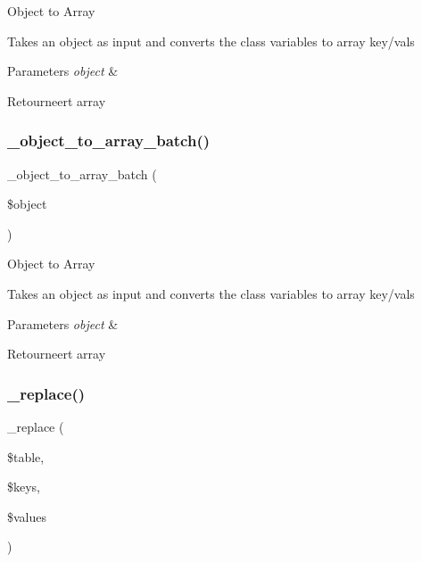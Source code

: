 Object to Array

Takes an object as input and converts the class variables to array key/vals


\begin{DoxyParams}{Parameters}
{\em object} & \\
\hline
\end{DoxyParams}
\begin{DoxyReturn}{Retourneert}
array 
\end{DoxyReturn}
\mbox{\label{class_c_i___d_b__query__builder_ab53f659c5df0b0b6d30eaab74f507dc5}} 
\subsubsection{\texorpdfstring{\_object\_to\_array\_batch()}{\_object\_to\_array\_batch()}}
{\footnotesize\ttfamily \+\_\+object\+\_\+to\+\_\+array\+\_\+batch (\begin{DoxyParamCaption}\item[{}]{\$object }\end{DoxyParamCaption})\hspace{0.3cm}{\ttfamily [protected]}}

Object to Array

Takes an object as input and converts the class variables to array key/vals


\begin{DoxyParams}{Parameters}
{\em object} & \\
\hline
\end{DoxyParams}
\begin{DoxyReturn}{Retourneert}
array 
\end{DoxyReturn}
\mbox{\label{class_c_i___d_b__query__builder_ae0adf73984daf2d42ad29b66c484c82b}} 
\subsubsection{\texorpdfstring{\_replace()}{\_replace()}}
{\footnotesize\ttfamily \+\_\+replace (\begin{DoxyParamCaption}\item[{}]{\$table,  }\item[{}]{\$keys,  }\item[{}]{\$values }\end{DoxyParamCaption})\hspace{0.3cm}{\ttfamily [protected]}}

